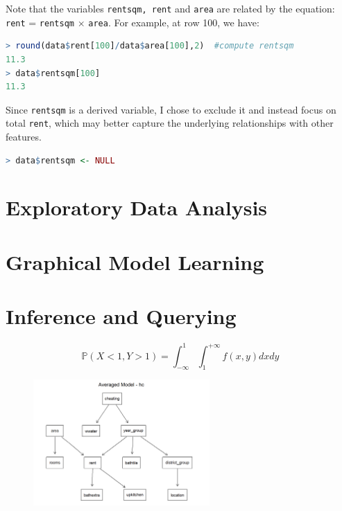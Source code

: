 \documentclass[15pt,a4paper]{report}
\begin{document}
Note that the variables \lstinline[language=R]|rentsqm, rent| and \lstinline[language=R]|area| are related by the equation: \lstinline[language=R]|rent| = \lstinline[language=R]|rentsqm| $\times$ \lstinline[language=R]|area|. For example, at row 100, we have:

\begin{lstlisting}[language=R]
> round(data$rent[100]/data$area[100],2)  #compute rentsqm
11.3
> data$rentsqm[100]
11.3
\end{lstlisting}
Since \lstinline[language=R]|rentsqm| is a derived variable, I chose to exclude it and instead focus on total \lstinline[language=R]|rent|, which may better capture the underlying relationships with other features.
\begin{lstlisting}[language=R]
> data$rentsqm <- NULL
\end{lstlisting}
\section*{Exploratory Data Analysis}
\section*{Graphical Model Learning}
\section*{Inference and Querying}
\newpage

\[
\mathbb{P}(X<1,Y>1)=\int_{-\infty}^{1}\int_{1}^{+\infty}f(x,y) dx dy 
\]
\begin{figure}[H]
	\centering \includegraphics[width=0.6\textwidth]{unnamed-chunk-30-2.png}
\end{figure}
\end{document}
